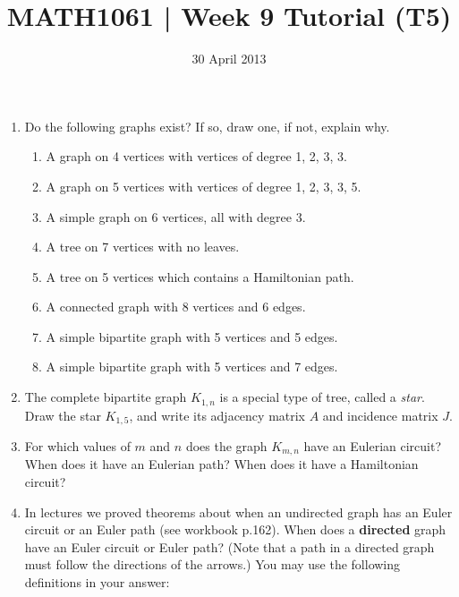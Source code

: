 \documentclass[a4paper,12pt]{article}
\begin{document}
\pagestyle{myheadings}

\title{MATH1061 | Week 9 Tutorial (T5)}
\date{30 April 2013}
\maketitle

\begin{enumerate}
\item
Do the following graphs exist? If so, draw one, if not,
explain why.
    \begin{enumerate}
    \item A graph on 4 vertices with vertices of degree 1, 2, 3, 3.
    \item A graph on 5 vertices with vertices of degree 1, 2, 3, 3, 5.
    \item A simple graph on 6 vertices, all with degree 3.
    \item A tree on 7 vertices with no leaves.
    \item A tree on 5 vertices which contains a Hamiltonian path.
    \item A connected graph with 8 vertices and 6 edges.
    \item A simple bipartite graph with 5 vertices and 5 edges.
    \item A simple bipartite graph with 5 vertices and 7 edges.
    \end{enumerate}
\item
The complete bipartite graph $K_{1,n}$ is a special type of tree, called a
{\em star}. Draw the star $K_{1,5}$, and write its adjacency matrix $A$ and
incidence matrix $J$.
\item
For which values of $m$ and $n$ does the graph $K_{m,n}$ have an Eulerian circuit?
When does it have an Eulerian path? When does it have a Hamiltonian circuit?
\item
In lectures we proved theorems about when an undirected graph has an Euler
circuit or an Euler path (see workbook p.162).
When does a {\bf directed} graph have an Euler circuit or Euler path? (Note that
a path in a directed graph must follow the directions of the arrows.) You may
use the following definitions in your answer:


\end{enumerate}
\end{document}
